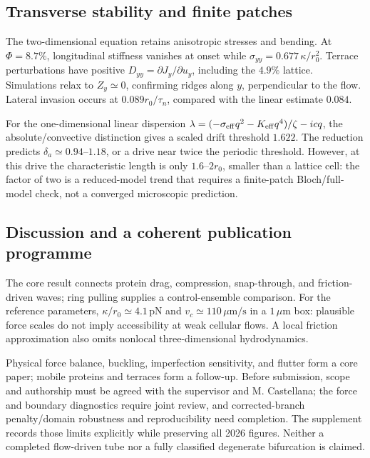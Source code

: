 
\subsection{Transverse stability and finite patches}
The two-dimensional equation retains anisotropic stresses and bending. At $\Phi=8.7\%$, longitudinal stiffness vanishes at onset while $\sigma_{yy}=0.677\,\kappa/r_0^2$. Terrace perturbations have positive $D_{yy}=\partial J_y/\partial u_y$, including the $4.9\%$ lattice. Simulations relax to $Z_y\simeq0$, confirming ridges along $y$, perpendicular to the flow. Lateral invasion occurs at $0.089r_0/\tau_n$, compared with the linear estimate $0.084$.

For the one-dimensional linear dispersion $\lambda=(-\sigma_{\rm eff}q^2-K_{\rm eff}q^4)/\zeta-icq$, the absolute/convective distinction \cite{huerre} gives a scaled drift threshold $1.622$. The reduction predicts $\delta_a\simeq0.94$--$1.18$, or a drive near twice the periodic threshold. However, at this drive the characteristic length is only $1.6$--$2r_0$, smaller than a lattice cell: the factor of two is a reduced-model trend that requires a finite-patch Bloch/full-model check, not a converged microscopic prediction.

\subsection{Discussion and a coherent publication programme}
The core result connects protein drag, compression, snap-through, and friction-driven waves; ring pulling supplies a control-ensemble comparison. For the reference parameters, $\kappa/r_0\simeq4.1\,\mathrm{pN}$ and $v_c\simeq110\,\mu\mathrm{m/s}$ in a $1\,\mu\mathrm m$ box: plausible force scales do not imply accessibility at weak cellular flows. A local friction approximation also omits nonlocal three-dimensional hydrodynamics.

Physical force balance, buckling, imperfection sensitivity, and flutter form a core paper; mobile proteins and terraces form a follow-up. Before submission, scope and authorship must be agreed with the supervisor and M. Castellana; the force and boundary diagnostics require joint review, and corrected-branch penalty/domain robustness and reproducibility need completion. The supplement records those limits explicitly while preserving all 2026 figures. Neither a completed flow-driven tube nor a fully classified degenerate bifurcation is claimed.

\clearpage


